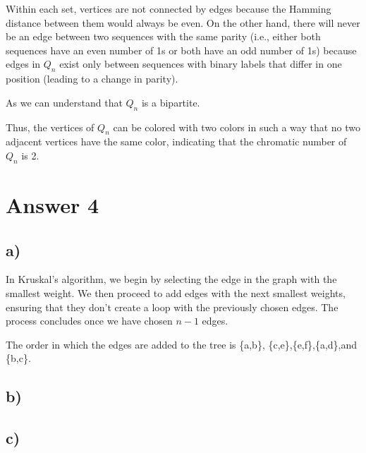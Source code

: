 \documentclass[12pt]{article}
\begin{document}
Within each set, vertices are not connected by edges because the Hamming distance between them would always be even. On the other hand, there will never be an edge between two sequences with the same parity (i.e., either both sequences have an even number of 1s or both have an odd number of 1s) because edges in \( Q_n \) exist only between sequences with binary labels that differ in one position (leading to a change in parity).

As we can understand that \( Q_n \) is a bipartite.

Thus, the vertices of \( Q_n \) can be colored with two colors in such a way that no two adjacent vertices have the same color, indicating that the chromatic number of \( Q_n \) is 2.


\section*{Answer 4}

\subsection*{a)}

In Kruskal's algorithm, we begin by selecting the edge in the graph with the smallest weight. We then proceed to add edges with the next smallest weights, ensuring that they don't create a loop with the previously chosen edges. The process concludes once we have chosen \( n - 1 \) edges.

The order in which the edges are added to the tree is \{a,b\}, \{c,e\},\{e,f\},\{a,d\},and \{b,c\}.

\subsection*{b)}



\subsection*{c)}
\end{document}
